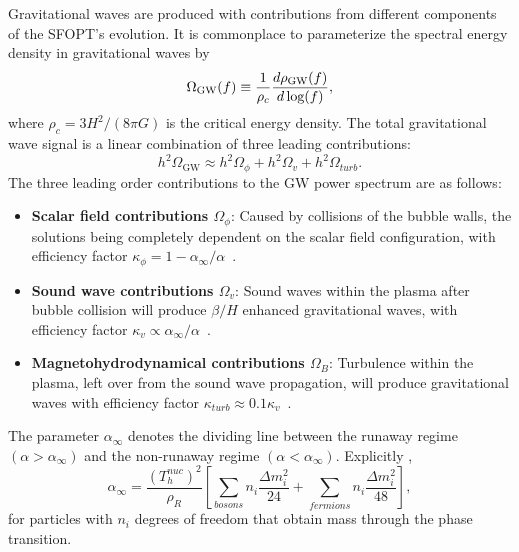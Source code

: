 \documentclass[nofootinbib,twocolumn,preprintnumbers]{revtex4-1}
\begin{document}
Gravitational waves are produced with contributions from different components of the SFOPT's evolution.  It is commonplace to parameterize the spectral energy density in gravitational waves by~\citep{PhysRevD.75.043507} 
\begin{equation}\label{eqn:SpectralEng}
\Omega_{\textrm{GW}} (f) \equiv \frac{1}{ \rho_{c}} \frac{d \rho_{\textrm{GW}}(f) }{d \textrm{\,log}(f)} , 
\end{equation}
where $\rho_{c} = 3H^2/(8 \pi G)$ is the critical energy density. The total gravitational wave signal is a linear combination of three leading contributions:
\begin{equation}
h^2\Omega_{\textrm{GW}} \approx h^2\Omega_{\phi} + h^2\Omega_{v} + h^2\Omega_{turb} .
\end{equation}
The three leading order contributions to the GW power spectrum are as follows:
\begin{itemize}
\item \textbf{Scalar field contributions $\Omega_{\phi}$}: Caused by collisions of the bubble walls, the solutions being completely dependent on the scalar field configuration, with efficiency factor $\kappa_{\phi} = 1 - \alpha_{\infty}/\alpha$~\citep{PhysRevD.45.4514, Huber_2008}. 
\item \textbf{Sound wave contributions $\Omega_{v}$}: Sound waves within the plasma after bubble collision will produce $\beta/H$ enhanced gravitational waves, with efficiency factor $\kappa_{v} \propto \alpha_{\infty}/\alpha$~\citep{PhysRevLett.112.041301}.
\item \textbf{Magnetohydrodynamical contributions $\Omega_{B}$}: Turbulence within the plasma, left over from the sound wave propagation, will produce gravitational waves with efficiency factor $\kappa_{
turb} \approx 0.1 \kappa_{v} $~\citep{PhysRevD.74.063521}.
\end{itemize}
The parameter $\alpha_{\infty}$ denotes the dividing line between the runaway regime  $(\alpha >\alpha_{\infty})$ and the non-runaway regime $(\alpha <\alpha_{\infty})$. Explicitly \cite{Breitbach:2018ddu, Caprini:2015zlo, Espinosa:2010hh}, 
\begin{equation}\label{eqn:critPTstrength}
\alpha_{\infty} = \frac{(T^{nuc}_h)^2}{\rho_R}\left[\sum_{bosons} n_i\frac{\Delta m^2_i}{24} + \sum_{fermions} n_i\frac{\Delta m_i^2}{48}\right],
\end{equation} 
for particles with $n_i$ degrees of freedom that obtain mass through the phase transition. 
\end{document}
